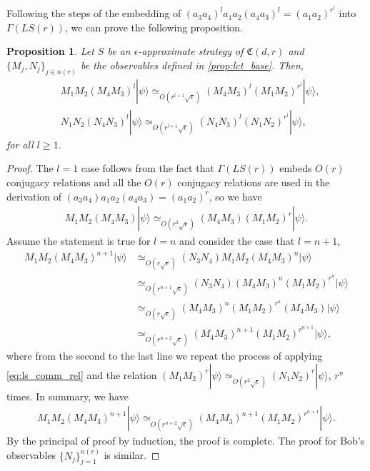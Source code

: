 \documentclass[11pt,letterpaper]{article}
\newcommand{\ket}[1]{|#1\rangle}
\newcommand{\1}{\mathbb{1}}
\newcommand{\LS}{LS}
\newcommand{\nr}{n(r)}
\newcommand{\fC}{\mathfrak{C}}
\newcommand{\ep}{\epsilon}
\newcommand{\se}{\sqrt{\epsilon}}
\newcommand{\appd}[1]{\simeq_{#1}}
\newtheorem{proposition}[theorem]{Proposition}
\theoremstyle{definition}
\begin{document}
Following the steps of the embedding of $(a_3a_4)^l a_1a_2(a_4a_3)^l = (a_1a_2)^{r^l}$ into $\Gamma(\LS(r))$,
we can prove the following proposition.
\begin{proposition}
\label{prop:lct_adv}
Let $S$ be an $\ep$-approximate strategy of $\fC(d,r)$ and $\{M_j, N_j\}_{j \in \nr}$ be the observables defined in 
\cref{prop:lct_base}. 
Then,
\begin{align}
	&M_1M_2 (M_4M_3)^l \ket{\psi}\appd{O(r^{l+1} \se)} (M_4M_3)^l (M_1M_2)^{r^l} \ket{\psi}, \\
	&N_1N_2 (N_4N_3)^l \ket{\psi}\appd{O(r^{l+1} \se)} (N_4N_3)^l (N_1N_2)^{r^l} \ket{\psi}, 
\end{align}
for all $l \geq 1$.
\end{proposition}
\begin{proof}
The $l = 1$ case follows from the fact that $\Gamma(\LS(r))$ embeds $O(r)$ conjugacy relations and 
all the $O(r)$ conjugacy relations are used in the derivation of $(a_3a_4)a_1a_2(a_4a_3) = (a_1a_2)^r$, so we 
have
\begin{align}
	\label{eq:ls_comm_rel}
	M_1M_2 (M_4M_3) \ket{\psi} \appd{O(r^2\se)} (M_4M_3)(M_1M_2)^r \ket{\psi}.
\end{align}
Assume the statement is true for $l = n$ and consider the case that $l = n+1$,
\begin{align*}
	M_1M_2 (M_4M_3)^{n+1} \ket{\psi}  &\appd{O(r\se)} (N_3N_4) M_1M_2(M_4M_3)^n \ket{\psi} \\
	&\appd{O(r^{n+1}\se)} (N_3N_4) (M_4M_3)^n (M_1M_2)^{r^n} \ket{\psi}\\
	&\appd{O(r\se)} (M_4M_3)^n (M_1M_2)^{r^n} (M_4M_3) \ket{\psi} \\
	& \appd{O(r^{n+2} \se)} (M_4M_3)^{n+1} (M_1M_2)^{r^{n+1}} \ket{\psi},
\end{align*}
where from the second to the last line we repeat the process of applying \cref{eq:ls_comm_rel} 
and the relation $(M_1M_2)^r \ket{\psi} \appd{O(r^2\se)} (N_1N_2)^r \ket{\psi}$, $r^n$ times.
In summary, we have 
\begin{align}
	M_1M_2(M_4M_3)^{n+1} \ket{\psi} \appd{O(r^{n+2} \se)} (M_4M_3)^{n+1} (M_1M_2)^{r^{n+1}}\ket{\psi}.
\end{align}
By the principal of proof by induction, the proof is complete.
The proof for Bob's observables $\{ N_j \}_{j=1}^{\nr}$ is similar.
\end{proof}
\end{document}
